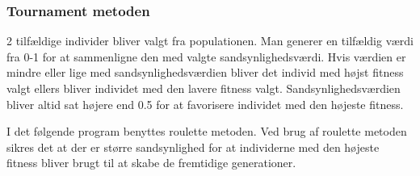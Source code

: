\subsubsection{Tournament metoden}

2 tilfældige individer bliver valgt fra populationen. Man generer en tilfældig værdi fra 0-1 for at sammenligne den med valgte sandsynlighedsværdi. Hvis værdien er mindre eller lige med sandsynlighedsværdien bliver det individ med højst fitness valgt ellers bliver individet med den lavere fitness valgt. Sandsynlighedsværdien bliver altid sat højere end 0.5 for at favorisere individet med den højeste fitness. 

I det følgende program benyttes roulette metoden. Ved brug af roulette metoden sikres det at der er større sandsynlighed for at individerne med den højeste fitness bliver brugt til at skabe de fremtidige generationer. 
